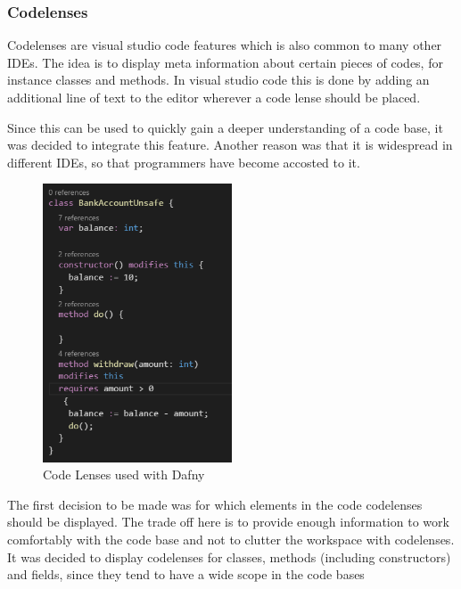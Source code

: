 \subsubsection{Codelenses} \label{codelenses}
Codelenses are visual studio code features which is also common to many other IDEs. The idea is to display meta information about certain pieces of codes, for instance classes and methods. In visual studio code this is done  by adding an additional line of text to the editor wherever a code lense should  be placed. \newline

Since this can be used to quickly gain a deeper understanding of a code base, it was decided to integrate this feature. Another reason was that it is widespread in different IDEs, so that programmers have become accosted to it. \newline

\begin{figure}[H]
	\centering
	\includegraphics[width=0.5\textwidth]{img/codelensesClosed}
	\caption{Code Lenses used with Dafny}
	\label{fig:codelensesclosed}
\end{figure}

The first decision to be made was for which elements in the code codelenses should be displayed. The trade off here is to  provide enough information to work comfortably with the code base and not to clutter the workspace with codelenses. It was decided to display codelenses for classes, methods (including constructors) and fields, since they tend to have a wide scope in the code bases \newline


